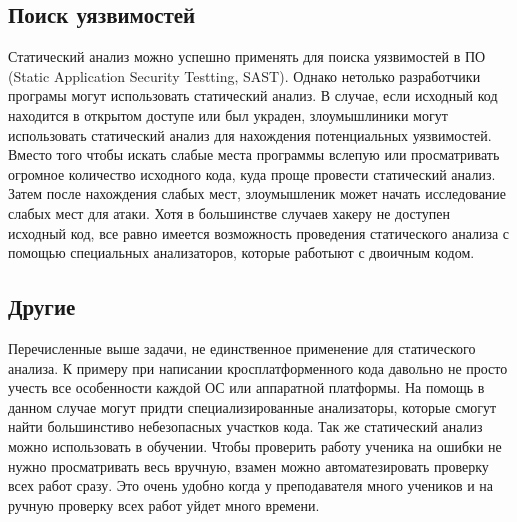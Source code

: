 \subsection {Поиск уязвимостей}
Статический анализ можно успешно применять для поиска уязвимостей в ПО (Static Application Security Testting, SAST).
Однако нетолько разработчики програмы могут использовать статический анализ. В случае, если
исходный код находится в открытом доступе или был украден, злоумышлиники могут использовать 
статический анализ для нахождения потенциальных уязвимостей. Вместо того чтобы искать слабые
места программы вслепую или просматривать огромное количество исходного кода, куда проще провести статический анализ.
Затем после нахождения слабых мест, злоумышленик может начать исследование слабых мест для атаки.
Хотя в большинстве случаев хакеру не доступен исходный код, все равно имеется возможность проведения 
статического анализа с помощью специальных анализаторов, которые работыют с двоичным кодом.

\subsection {Другие}
Перечисленные выше задачи, не единственное применение для статического анализа. К примеру 
при написании кросплатформенного кода давольно не просто учесть все особенности каждой ОС
или аппаратной платформы. На помощь в данном случае могут придти специализированные анализаторы,
которые смогут найти большинстиво небезопасных участков кода. 
Так же статический анализ можно использовать в обучении. Чтобы проверить работу ученика на ошибки
не нужно просматривать весь вручную, взамен можно автоматезировать проверку всех работ сразу.
Это очень удобно когда у преподавателя много учеников и на ручную проверку всех работ уйдет
много времени. 


